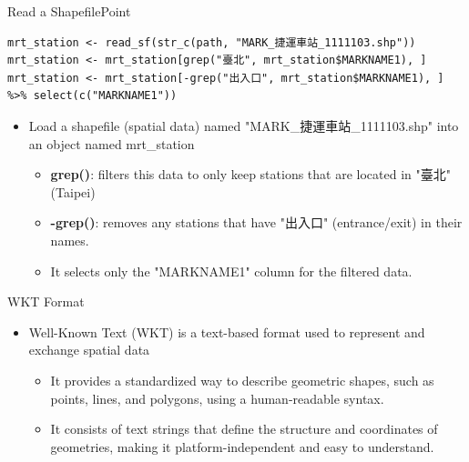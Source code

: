 \documentclass[hyperref={pdfpagelabels=false}]{beamer}
\begin{document}
\begin{frame}[fragile]{Read a Shapefile}{Point}
	
\begin{lstlisting}
mrt_station <- read_sf(str_c(path, "MARK_捷運車站_1111103.shp"))
mrt_station <- mrt_station[grep("臺北", mrt_station$MARKNAME1), ]
mrt_station <- mrt_station[-grep("出入口", mrt_station$MARKNAME1), ] %>% select(c("MARKNAME1"))
\end{lstlisting}
	\begin{itemize}
		
		\item Load a shapefile (spatial data) named "MARK\_捷運車站\_1111103.shp" into an object named mrt\_station
		\vspace{0.2cm}
		\begin{itemize}
			\item \textbf{grep()}: filters this data to only keep stations that are located in "臺北" (Taipei)
					\vspace{0.2cm}
			\item \textbf{-grep()}: removes any stations that have "出入口" (entrance/exit) in their names.		
								\vspace{0.2cm}
			\item It selects only the "MARKNAME1" column for the filtered data.					
		\end{itemize}
		
	\end{itemize}
\end{frame}




\begin{frame}{WKT Format}
\begin{itemize}
	\item Well-Known Text (WKT) is a text-based format used to represent and exchange spatial data
			\vspace{0.2cm}
			\begin{itemize}
	\item It provides a standardized way to describe geometric shapes, such as points, lines, and polygons, using a human-readable syntax.
			\vspace{0.2cm}
	\item It consists of text strings that define the structure and coordinates of geometries, making it platform-independent and easy to understand.
\end{itemize}
\end{itemize}
\end{frame}
\end{document}

